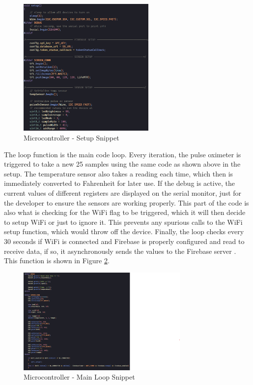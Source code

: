 \documentclass[12pt]{article}
\begin{document}
    \begin{figure}[hbt!]
        \centering
        \includegraphics[width=0.6\textwidth]{uc_setup_1}
        \caption{Microcontroller - Setup Snippet}
        \label{uc_setup}
    \end{figure} 

    The loop function is the main code loop. Every iteration, the pulse oximeter is triggered to take a new 25 samples using the same code as shown above in the setup. The temperature sensor also takes a reading each time, which then is immediately converted to Fahrenheit for later use. If the debug is active, the current values of different registers are displayed on the serial monitor, just for the developer to ensure the sensors are working properly. This part of the code is also what is checking for the WiFi flag to be triggered, which it will then decide to setup WiFi or just to ignore it. This prevents any spurious calls to the WiFi setup function, which would throw off the device. Finally, the loop checks every 30 seconds if WiFi is connected and Firebase is properly configured and read to receive data, if so, it asynchronously sends the values to the Firebase server \cite{firebase_client_lib}. This function is shown in Figure \ref{uc_main}.

    \begin{figure}[hbt!]
        \centering
        \includegraphics[width=0.75\textwidth]{uc_main}
        \caption{Microcontroller - Main Loop Snippet}
        \label{uc_main}
    \end{figure} 
\end{document}
